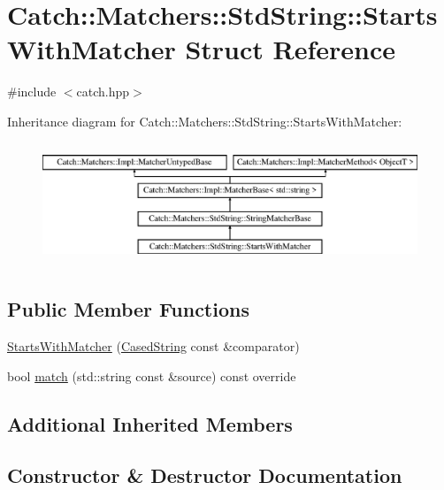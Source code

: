 \hypertarget{structCatch_1_1Matchers_1_1StdString_1_1StartsWithMatcher}{}\section{Catch\+:\+:Matchers\+:\+:Std\+String\+:\+:Starts\+With\+Matcher Struct Reference}
\label{structCatch_1_1Matchers_1_1StdString_1_1StartsWithMatcher}


{\ttfamily \#include $<$catch.\+hpp$>$}

Inheritance diagram for Catch\+:\+:Matchers\+:\+:Std\+String\+:\+:Starts\+With\+Matcher\+:\begin{figure}[H]
\begin{center}
\leavevmode
\includegraphics[height=3.696370cm]{structCatch_1_1Matchers_1_1StdString_1_1StartsWithMatcher}
\end{center}
\end{figure}
\subsection*{Public Member Functions}
\begin{DoxyCompactItemize}
\item 
\mbox{\hyperlink{structCatch_1_1Matchers_1_1StdString_1_1StartsWithMatcher_a7b86f258bdbd131a6e7bcd94a8977325}{Starts\+With\+Matcher}} (\mbox{\hyperlink{structCatch_1_1Matchers_1_1StdString_1_1CasedString}{Cased\+String}} const \&comparator)
\item 
bool \mbox{\hyperlink{structCatch_1_1Matchers_1_1StdString_1_1StartsWithMatcher_a7da4747aed0c48989d8be59a89e2b7fb}{match}} (std\+::string const \&source) const override
\end{DoxyCompactItemize}
\subsection*{Additional Inherited Members}


\subsection{Constructor \& Destructor Documentation}
\mbox{\label{structCatch_1_1Matchers_1_1StdString_1_1StartsWithMatcher_a7b86f258bdbd131a6e7bcd94a8977325}} 
